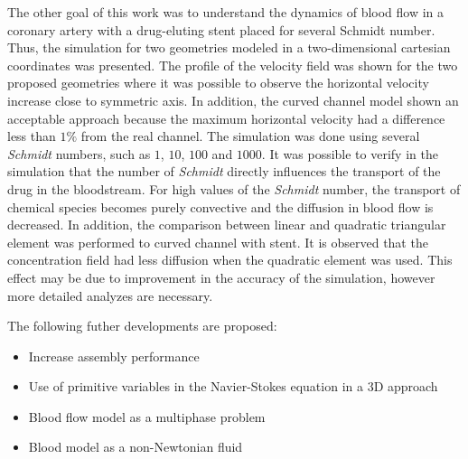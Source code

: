 \medskip
The other goal of this work was to understand the dynamics of blood 
flow in a coronary artery with 
a drug-eluting stent placed for several Schmidt number. Thus, the simulation for two geometries 
modeled in a two-dimensional cartesian coordinates was presented. 
The profile of the velocity field was shown for the two proposed 
geometries where it was possible to observe the horizontal
velocity increase close to symmetric axis. In addition,
the curved channel model shown an acceptable approach because
the maximum horizontal velocity had a difference less than $1\%$ 
from the real channel.  
The simulation was done using several \textit{Schmidt} numbers, 
such as $1$, $10$, $100$ and $1000$. It was possible to verify in the 
simulation that the number of \textit{Schmidt} directly influences 
the transport of the drug in the bloodstream. For high values of 
the \textit{Schmidt} number, the transport of chemical species 
becomes purely convective and the diffusion in blood flow is decreased. 
In addition, the comparison between linear and quadratic triangular
element was performed to curved channel with stent. It is observed that
the concentration field had less diffusion when the quadratic element
was used. This effect may be due to improvement in the accuracy
of the simulation, however more detailed analyzes are necessary.


\vspace{0.7cm}
\noindent
The following futher developments are proposed:

\begin{itemize}
 \vspace{-0.3cm}
 \item Increase assembly performance

 \item Use of primitive variables in the Navier-Stokes equation in a 3D approach
 
 \item Blood flow model as a multiphase problem

 \item Blood model as a non-Newtonian fluid
\end{itemize}








